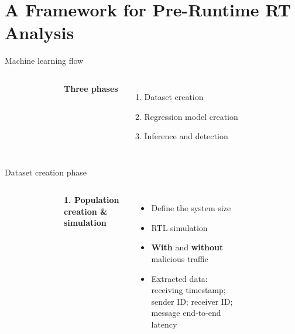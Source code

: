 \section{A Framework for Pre-Runtime RT Analysis}

\begin{frame}{Machine learning flow}
    \begin{columns}
        \vspace{-1cm}
        \begin{figure}[!ht]
            \centering
            
        \end{figure}

        \textbf{Three phases}
        \begin{enumerate}
            \item \textcolor{omni-spring-pastels-7}{Dataset creation}
            \item \textcolor{omni-spring-pastels-8}{Regression model creation}
            \item \textcolor{omni-spring-pastels-9}{Inference and detection}
        \end{enumerate}
    \end{columns}
\end{frame}

\begin{frame}{Dataset creation phase}
    \begin{columns}
        \vspace{-1cm}
        \begin{figure}[!ht]
            \centering
            
        \end{figure}

        
        \textbf{\textcolor{omni-spring-pastels-7}{1. Population creation \& simulation}}
        \vspace{-0.5cm}
        \begin{columns}
            \begin{itemize}
                \item Define the system size
                \item RTL simulation
                \item \textbf{With} and \textbf{without} malicious traffic
                \item Extracted data: receiving timestamp; sender ID; receiver ID; message end-to-end latency
            \end{itemize}

            \begin{figure}[!ht]
                \centering
                \resizebox{\linewidth}{!}{
                    
                }
            \end{figure}
        \end{columns}
    \end{columns}
\end{frame}

